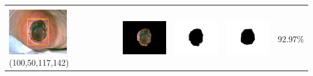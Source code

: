 \begin{table}[H]
\begin{tabular}{|m{1.0in}|m{1.0in}|m{1.0in}|m{1.0in}|m{0.6in}|}
		&  &  & \\
		\includegraphics[width=1.0in]{gambar/hasil_segmentasi/luka_hitam/image_7_rect.jpg} {\centering\fontsize{10}{10}\selectfont(100,50,117,142)}&
		\includegraphics[width=1.0in]{gambar/hasil_segmentasi/luka_hitam/result_7.jpg}&
		\includegraphics[width=1.0in]{gambar/hasil_segmentasi/luka_hitam/mask_r_7.jpg}&
		\includegraphics[width=1.0in]{gambar/hasil_segmentasi/luka_hitam/7_r.jpg}&
		92.97\% \\
		\hline
	\end{tabular}
\end{table}

